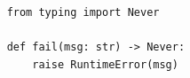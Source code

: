 \begin{verbatim}
    from typing import Never

    def fail(msg: str) -> Never:
        raise RuntimeError(msg)
\end{verbatim}